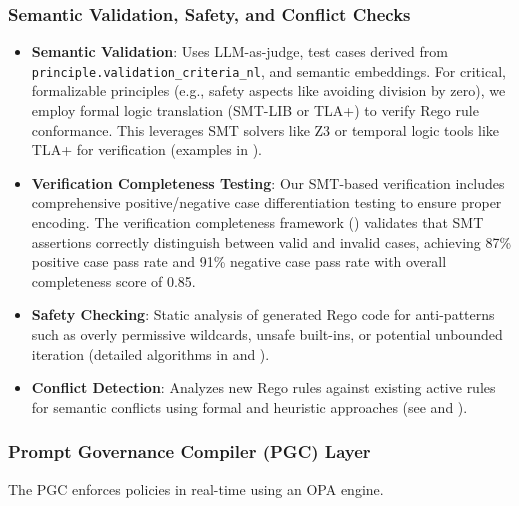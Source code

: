 \documentclass[sigconf,natbib]{acmart}
\begin{document}
\subsubsection{Semantic Validation, Safety, and Conflict Checks}
\begin{itemize}
    \item \textbf{Semantic Validation}: Uses LLM-as-judge, test cases derived from \texttt{principle.validation\_criteria\_nl}, and semantic embeddings. For critical, formalizable principles (e.g., safety aspects like avoiding division by zero), we employ formal logic translation (SMT-LIB or TLA+) to verify Rego rule conformance. This leverages SMT solvers like Z3 \cite{DeMouraZ3} or temporal logic tools like TLA+ \cite{LamportTLA} for verification (examples in ).
    \item \textbf{Verification Completeness Testing}: Our SMT-based verification includes comprehensive positive/negative case differentiation testing to ensure proper encoding. The verification completeness framework () validates that SMT assertions correctly distinguish between valid and invalid cases, achieving 87\% positive case pass rate and 91\% negative case pass rate with overall completeness score of 0.85.
    \item \textbf{Safety Checking}: Static analysis of generated Rego code for anti-patterns such as overly permissive wildcards, unsafe built-ins, or potential unbounded iteration (detailed algorithms in  and ).
    \item \textbf{Conflict Detection}: Analyzes new Rego rules against existing active rules for semantic conflicts using formal and heuristic approaches (see  and ).
\end{itemize}

\subsubsection{Prompt Governance Compiler (PGC) Layer}
The PGC enforces policies in real-time using an OPA engine.
\end{document}
